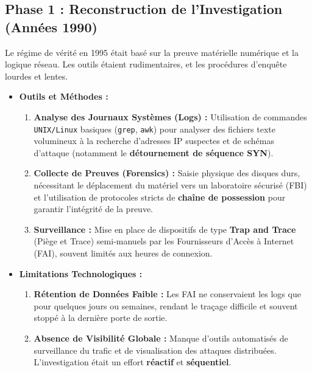 \documentclass[a4paper,12pt]{report}
\begin{document}
	\subsection*{Phase 1 : Reconstruction de l'Investigation (Années 1990)}
	Le régime de vérité en 1995 était basé sur la preuve matérielle numérique et la logique réseau. Les outils étaient rudimentaires, et les procédures d'enquête lourdes et lentes.
	\begin{itemize}
		\item \textbf{Outils et Méthodes :}
		\begin{enumerate}
			\item \textbf{Analyse des Journaux Systèmes (Logs) :} Utilisation de commandes \texttt{UNIX/Linux} basiques (\texttt{grep}, \texttt{awk}) pour analyser des fichiers texte volumineux à la recherche d'adresses IP suspectes et de schémas d'attaque (notamment le \textbf{détournement de séquence SYN}).
			\item \textbf{Collecte de Preuves (Forensics) :} Saisie physique des disques durs, nécessitant le déplacement du matériel vers un laboratoire sécurisé (FBI) et l'utilisation de protocoles stricts de \textbf{chaîne de possession} pour garantir l'intégrité de la preuve.
			\item \textbf{Surveillance :} Mise en place de dispositifs de type \textbf{Trap and Trace} (Piège et Trace) semi-manuels par les Fournisseurs d'Accès à Internet (FAI), souvent limités aux heures de connexion.
		\end{enumerate}
		\item \textbf{Limitations Technologiques :}
		\begin{enumerate}
			\item \textbf{Rétention de Données Faible :} Les FAI ne conservaient les logs que pour quelques jours ou semaines, rendant le traçage difficile et souvent stoppé à la dernière porte de sortie.
			\item \textbf{Absence de Visibilité Globale :} Manque d'outils automatisés de surveillance du trafic et de visualisation des attaques distribuées. L'investigation était un effort \textbf{réactif} et \textbf{séquentiel}.
		\end{enumerate}
	\end{itemize}
	
\end{document}
